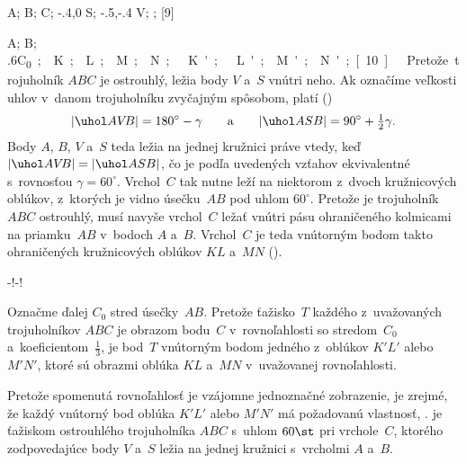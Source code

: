 {%
\fontplace
\tpoint A; \tpoint B; \bpoint C;
\tpoint\xy-.4,0 S; \tpoint\xy-.5,-.4 V;
\cpoint \gamma;
[9] \hfil\Obr

\fontplace
\rpoint A; \lpoint B;
\tpoint\down.6\unit C_0;
\lbpoint K; \rbpoint L; \rtpoint M; \ltpoint N;
\lpoint\down\unit K'; \rpoint\down\unit L'; \rBpoint M'; \lBpoint N';
[10] \hfil\Obr

Pretože trojuholník $ABC$ je ostrouhlý, ležia body $V$ a~$S$
vnútri neho. Ak označíme veľkosti uhlov v~danom trojuholníku zvyčajným
spôsobom, platí (\obr)
$$
|\uhol AV\!B|=180^{\circ}-\gamma \qquad \text{a} \qquad
    |\uhol ASB|=90^{\circ}+\tfrac12\gamma.
$$
Body $A$, $B$, $V$ a~$S$ teda ležia na jednej kružnici práve vtedy, keď
$|\uhol AV\!B|=|\uhol ASB|$, čo je podľa uvedených vzťahov
ekvivalentné s~rovnosťou $\gamma=60^{\circ}$. Vrchol~$C$ tak nutne
leží na niektorom z~dvoch kružnicových oblúkov, z~ktorých je vidno
úsečku~$AB$ pod uhlom $60^{\circ}$. Pretože je trojuholník $ABC$
ostrouhlý, musí navyše vrchol~$C$ ležať vnútri pásu ohraničeného
kolmicami na priamku~$AB$ v~bodoch $A$ a~$B$. Vrchol~$C$ je teda
vnútorným bodom takto ohraničených kružnicových oblúkov $KL$ a~$MN$
(\obr).

\midinsert
\centerline{\inspicture-!\hss\inspicture-!}
\endinsert

Označme ďalej $C_0$ stred úsečky~$AB$. Pretože ťažisko~$T$
každého z~uvažovaných trojuholníkov $ABC$ je obrazom bodu~$C$ 
v~rovnoľahlosti so stredom~$C_0$ a~koeficientom~$\frac13$, je
bod~$T$ vnútorným bodom jedného z~oblúkov $K'L'$ alebo $M'N'$, ktoré
sú obrazmi oblúka $KL$ a~$MN$ v~uvažovanej rovnoľahlosti.

Pretože spomenutá rovnoľahlosť je vzájomne jednoznačné zobrazenie,
je zrejmé, že každý vnútorný bod oblúka $K'L'$ alebo $M'N'$ má
požadovanú vlastnosť, \tj. je ťažiskom ostrouhlého trojuholníka $ABC$ 
s~uhlom $60\st$ pri vrchole~$C$, ktorého zodpovedajúce body $V$ a~$S$
ležia na jednej kružnici s~vrcholmi $A$ a~$B$.

}

